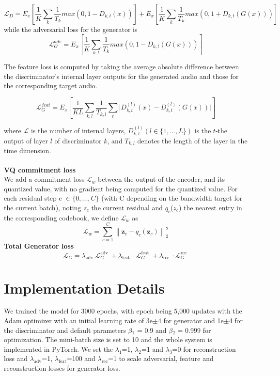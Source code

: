 \documentclass[12pt]{report}
\begin{document}
$$
\mathcal{L}_D = E_{x} [\frac{1}{K} \sum_{k}\frac{1}{T_{k}}max(0, 1-D_{k,t}(x))] + E_{x} [\frac{1}{K} \sum_{k}\frac{1}{T_{k}}max(0, 1+D_{k,t}(G(x)))]
$$
while the adversarial loss for the generator is
$$
\mathcal{L}_G^{adv} = E_{x} [\frac{1}{K} \sum_{k, t}\frac{1}{T_{k}}max(0, 1-D_{k,t}(G(x)))]
$$

The feature loss is computed by taking the average absolute difference between the discriminator’s internal layer outputs for the generated audio and those for the corresponding target audio.

$$
\mathcal{L}_G^{feat} = E_{x} [\frac{1}{KL} \sum_{k,l}\frac{1}{T_{k,l}}\sum_{t}\lvert D_{k,t}^{(l)}(x)-D_{k,t}^{(l)}(G(x)) \lvert] 
$$

where $\mathcal{L}$ is the number of internal layers, $D_{k,l}^{(l)} (l\in\big\{1,...,L\big\})$ is the $t$-the output of layer $l$ of discriminator $k$, and $T_{k,l}$ denotes the length of the layer in the time dimension.\\\\
\textbf{VQ commitment loss}\\
We add a commitment loss $\mathcal{L}_w$ between the output of
the encoder, and its quantized value, with no gradient being computed for the quantized value. For each residual step c $\in \big\{0,. . . , C\big\}$ (with C depending on the bandwidth target for the current batch), noting $z_{c}$ the
current residual and $q_{c}$($z_{c}$) the nearest entry in the corresponding codebook, we define $\mathcal{L}_w$ as
$$
\mathcal{L}_w=\sum_{c=1}^C\left\|\boldsymbol{z}_c-q_c\left(\boldsymbol{z}_c\right)\right\|_2^2
$$
\textbf{Total Generator loss} \\
$$
\mathcal{L}_G=\lambda_{\text {adv }} \mathcal{L}_G^{\text {adv }}+\lambda_{\text {feat }} \cdot \mathcal{L}_G^{\text {feat }}+\lambda_{\text {rec }} \cdot \mathcal{L}_G^{\text {rec }}
$$
\section{Implementation Details}
We trained the model for 3000 epochs, with epoch being 5,000 updates with the Adam optimizer with an initial learning rate of 3e$\pm$4 for generator and 1e$\pm$4 for the discriminator and default parameters $\beta{_1}$ = 0.9 and $\beta{_2}$ = 0.999 for optimization. The mini-batch size is set to 10 and the whole system is
implemented in PyTorch. We set the $\lambda_{1}$=1, $\lambda_{2}$=1 and $\lambda_{3}$=0 for reconstruction loss and  $\lambda_{\text {adv}}$=1, $\lambda_{\text {feat}}$=100 and $\lambda_{\text {rec}}$=1 to scale adversarial, feature and reconstruction losses for generator loss.
\end{document}
